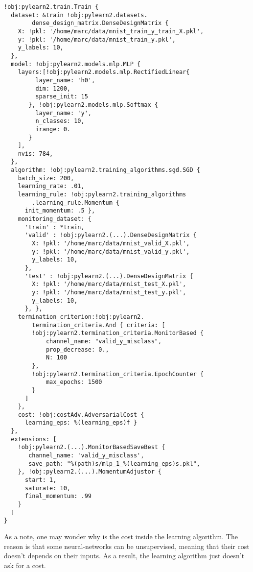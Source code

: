 		\lstset{language=Python}
		\begin{lstlisting}[basicstyle=\small,frame=single]
!obj:pylearn2.train.Train {
  dataset: &train !obj:pylearn2.datasets.
        dense_design_matrix.DenseDesignMatrix {
    X: !pkl: '/home/marc/data/mnist_train_y_train_X.pkl',
    y: !pkl: '/home/marc/data/mnist_train_y.pkl',
    y_labels: 10,
  },
  model: !obj:pylearn2.models.mlp.MLP {
    layers:[!obj:pylearn2.models.mlp.RectifiedLinear{
         layer_name: 'h0',
         dim: 1200,
         sparse_init: 15
       }, !obj:pylearn2.models.mlp.Softmax {
         layer_name: 'y',
         n_classes: 10,
         irange: 0.
       }
    ],
    nvis: 784,
  },
  algorithm: !obj:pylearn2.training_algorithms.sgd.SGD {
    batch_size: 200,
    learning_rate: .01,
    learning_rule: !obj:pylearn2.training_algorithms
        .learning_rule.Momentum {
      init_momentum: .5 },
    monitoring_dataset: {
      'train' : *train,
      'valid' : !obj:pylearn2.(...).DenseDesignMatrix {
        X: !pkl: '/home/marc/data/mnist_valid_X.pkl',
        y: !pkl: '/home/marc/data/mnist_valid_y.pkl',
        y_labels: 10,
      },
      'test' : !obj:pylearn2.(...).DenseDesignMatrix {
        X: !pkl: '/home/marc/data/mnist_test_X.pkl',
        y: !pkl: '/home/marc/data/mnist_test_y.pkl',
        y_labels: 10,
      }, },
    termination_criterion:!obj:pylearn2.
    	termination_criteria.And { criteria: [
        !obj:pylearn2.termination_criteria.MonitorBased {
            channel_name: "valid_y_misclass",
            prop_decrease: 0.,
            N: 100
        },
        !obj:pylearn2.termination_criteria.EpochCounter {
            max_epochs: 1500
        }
      ]
    },
    cost: !obj:costAdv.AdversarialCost {
      learning_eps: %(learning_eps)f }
  },
  extensions: [
    !obj:pylearn2.(...).MonitorBasedSaveBest {
       channel_name: 'valid_y_misclass',
       save_path: "%(path)s/mlp_1_%(learning_eps)s.pkl",
    }, !obj:pylearn2.(...).MomentumAdjustor {
      start: 1,
      saturate: 10,
      final_momentum: .99
    }
  ]
}
		\end{lstlisting}

		As a note, one may wonder why is the cost inside the learning algorithm. The reason is that some neural-networks can be unsupervised, meaning that their cost doesn't depends on their inputs. As a result, the learning algorithm just doesn't ask for a cost. 

